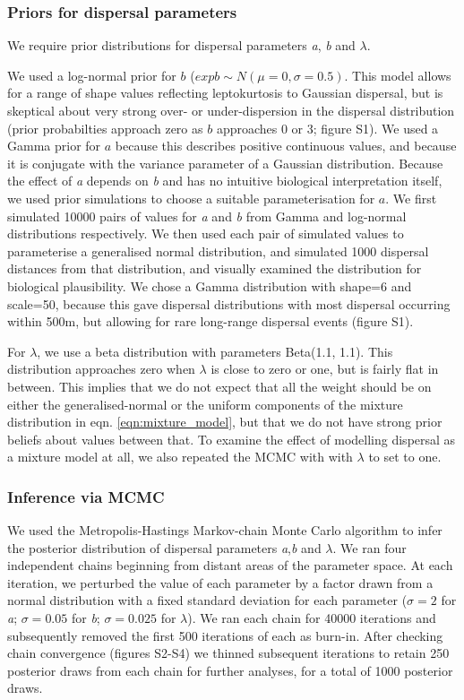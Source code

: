 \documentclass[10pt, a4paper, twocolumn]{article} %
\begin{document}
\subsubsection{Priors for dispersal parameters}

We require prior distributions for dispersal parameters \textit{a}, \textit{b} and $\lambda$.

We used a log-normal prior  for $b$ ($exp{b} \sim N(\mu=0, \sigma = 0.5)$.
This model allows for a range of shape values reflecting leptokurtosis to Gaussian dispersal, but is skeptical about very strong over- or under-dispersion in the dispersal distribution (prior probabilties approach zero as $b$ approaches 0 or 3; figure S1).
We used a Gamma prior for $a$ because this describes positive continuous values, and because it is conjugate with the variance parameter of a Gaussian distribution.
Because the effect of \textit{a} depends on \textit{b} and has no intuitive biological interpretation itself, we used prior simulations to choose a suitable parameterisation for $a$. We first simulated 10000 pairs of values for \textit{a} and \textit{b} from Gamma and log-normal distributions respectively. We then used each pair of simulated values to parameterise a generalised normal distribution, and simulated 1000 dispersal distances from that distribution, and visually examined the distribution for biological plausibility. We chose a Gamma distribution with shape=6 and scale=50, because this gave dispersal distributions with most dispersal occurring within 500m, but allowing for rare long-range dispersal events (figure S1).

For $\lambda$, we use a beta distribution with parameters Beta(1.1, 1.1). This distribution approaches zero when $\lambda$ is close to zero or one, but is fairly flat in between. This implies that we do not expect that all the weight should be on either the generalised-normal or the uniform components of the mixture distribution in eqn. \ref{eqn:mixture_model}, but that we do not have strong prior beliefs about values between that. To examine the effect of modelling dispersal as a mixture model at all, we also repeated the MCMC with with $\lambda$ to set to one.

\subsubsection{Inference via MCMC}

We used the Metropolis-Hastings Markov-chain Monte Carlo algorithm to infer the posterior distribution of dispersal parameters \textit{a},\textit{b} and $\lambda$. We ran four independent chains beginning from distant areas of the parameter space. At each iteration, we perturbed the value of each parameter by a factor drawn from a normal distribution with a fixed standard deviation for each parameter ($\sigma= 2$ for \textit{a}; $\sigma= 0.05$ for \textit{b}; $\sigma= 0.025$ for $\lambda$). We ran each chain for 40000 iterations and subsequently removed the first 500 iterations of each as burn-in. After checking chain convergence (figures S2-S4) we thinned subsequent iterations to retain 250 posterior draws from each chain for further analyses, for a total of 1000 posterior draws.
\end{document}
